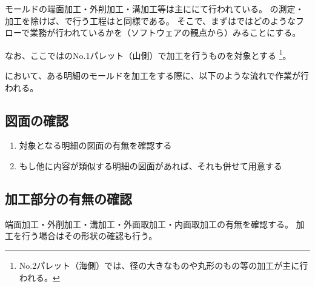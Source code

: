 



モールドの端面加工・外削加工・溝加工等は主に\MMname にて行われている。
\dimple の測定・加工を除けば、\DMname で行う工程は\MMname と同様である。
そこで、まずは\MMname ではどのようなフローで業務が行われているかを（ソフトウェアの観点から）みることにする。

なお、ここでは\MMname のNo.1パレット（山側）で加工を行うものを対象とする
\footnote{No.2パレット（海側）では、径の大きなものや丸形のもの等の加工が主に行われる。}。




\MMname において、ある明細のモールドを加工をする際に、以下のような流れで作業が行われる。

\subsection{図面の確認}
\begin{enumerate}
\item 対象となる明細の図面の有無を確認する
\item もし他に内容が類似する明細の図面があれば、それも併せて用意する
\end{enumerate}


\subsection{加工部分の有無の確認}
端面加工・外削加工・溝加工・外面取加工・内面取加工の有無を確認する。
加工を行う場合はその形状の確認も行う。

